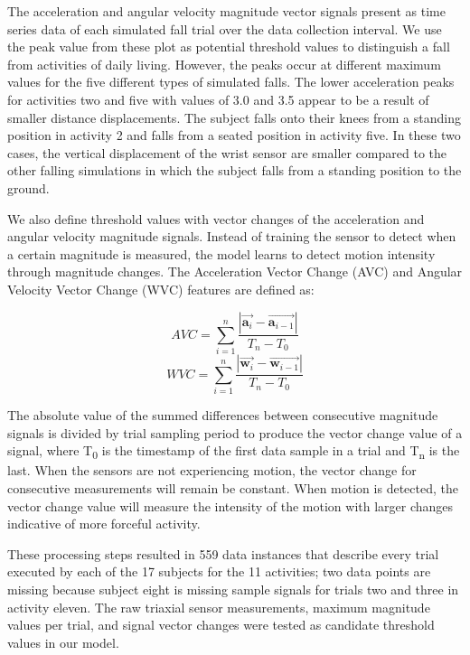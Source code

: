 \documentclass{llncs}
\begin{document}
\begin{table}
\begin{center}
\begin{tabular}{|c|c|c|}
			\bottomrule
		\end{tabular}
	\end{center}
\end{table}

The acceleration and angular velocity magnitude vector signals present as time series data of each simulated fall trial over the data collection interval. We use the peak value from these plot as potential threshold values to distinguish a fall from activities of daily living. However, the peaks occur at different maximum values for the five different types of simulated falls. The lower acceleration peaks for activities two and five with values of 3.0 and 3.5 appear to be a result of smaller distance displacements. The subject falls onto their knees from a standing position in activity 2 and falls from a seated position in activity five. In these two cases, the vertical displacement of the wrist sensor are smaller compared to the other falling simulations in which the subject falls from a standing position to the ground.

	We also define threshold values with vector changes of the acceleration and angular velocity magnitude signals. Instead of training the sensor to detect when a certain magnitude is measured, the model learns to detect motion intensity through magnitude changes. The Acceleration Vector Change (AVC) and Angular Velocity Vector Change (WVC) features are defined as:

	\begin{equation*}
    		AVC = \sum\limits_{i=1}^n \frac{| \vec{\mathbf{a}_{i}} - \vec{\mathbf{a}_{i-1}} |}{T_{n} - T_{0}}
	\end{equation*} 
	\begin{equation*}
		WVC = \sum\limits_{i=1}^n \frac{| \vec{\mathbf{w}_{i}} - \vec{\mathbf{w}_{i-1}} |}{T_{n} - T_{0}}
	\end{equation*} 

The absolute value of the summed differences between consecutive magnitude signals is divided by trial sampling period to produce the vector change value of a signal, where T\textsubscript{0} is the timestamp of the first data sample in a trial and T\textsubscript{n} is the last. When the sensors are not experiencing motion, the vector change for consecutive measurements will remain be constant. When motion is detected, the vector change value will measure the intensity of the motion with larger changes indicative of more forceful activity. 
	
	These processing steps resulted in 559 data instances that describe every trial executed by each of the 17 subjects for the 11 activities; two data points are missing because subject eight is missing sample signals for trials two and three in activity eleven. The raw triaxial sensor measurements, maximum magnitude values per trial, and signal vector changes were tested as candidate threshold values in our model. 
	
\end{document}

